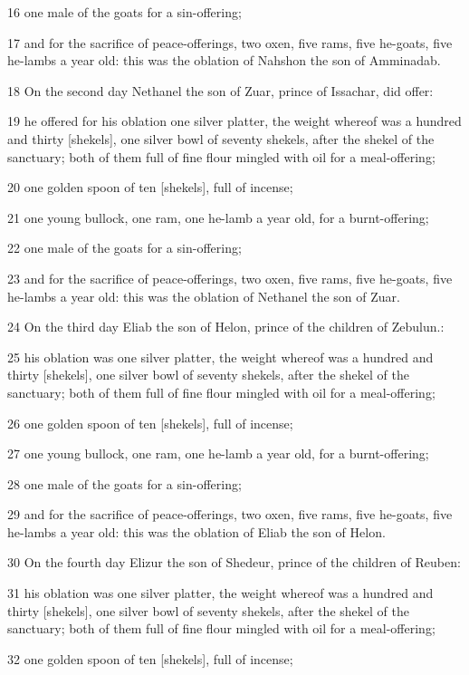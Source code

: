 \par 16 one male of the goats for a sin-offering;
\par 17 and for the sacrifice of peace-offerings, two oxen, five rams, five he-goats, five he-lambs a year old: this was the oblation of Nahshon the son of Amminadab.
\par 18 On the second day Nethanel the son of Zuar, prince of Issachar, did offer:
\par 19 he offered for his oblation one silver platter, the weight whereof was a hundred and thirty [shekels], one silver bowl of seventy shekels, after the shekel of the sanctuary; both of them full of fine flour mingled with oil for a meal-offering;
\par 20 one golden spoon of ten [shekels], full of incense;
\par 21 one young bullock, one ram, one he-lamb a year old, for a burnt-offering;
\par 22 one male of the goats for a sin-offering;
\par 23 and for the sacrifice of peace-offerings, two oxen, five rams, five he-goats, five he-lambs a year old: this was the oblation of Nethanel the son of Zuar.
\par 24 On the third day Eliab the son of Helon, prince of the children of Zebulun.:
\par 25 his oblation was one silver platter, the weight whereof was a hundred and thirty [shekels], one silver bowl of seventy shekels, after the shekel of the sanctuary; both of them full of fine flour mingled with oil for a meal-offering;
\par 26 one golden spoon of ten [shekels], full of incense;
\par 27 one young bullock, one ram, one he-lamb a year old, for a burnt-offering;
\par 28 one male of the goats for a sin-offering;
\par 29 and for the sacrifice of peace-offerings, two oxen, five rams, five he-goats, five he-lambs a year old: this was the oblation of Eliab the son of Helon.
\par 30 On the fourth day Elizur the son of Shedeur, prince of the children of Reuben:
\par 31 his oblation was one silver platter, the weight whereof was a hundred and thirty [shekels], one silver bowl of seventy shekels, after the shekel of the sanctuary; both of them full of fine flour mingled with oil for a meal-offering;
\par 32 one golden spoon of ten [shekels], full of incense;
